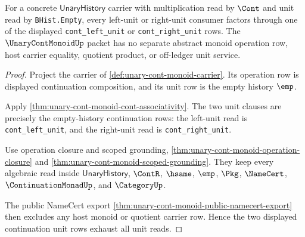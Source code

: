 \begin{theorem}
\label{thm:unary-cont-monoid-left-right-unit-exhaustion}
For a concrete $\mathsf{UnaryHistory}$ carrier with multiplication read by $\Cont$ and unit read by \texttt{BHist.Empty}, every left-unit or right-unit consumer factors through one of the displayed \texttt{cont\_left\_unit} or \texttt{cont\_right\_unit} rows. The $\UnaryContMonoidUp$ packet has no separate abstract monoid operation row, host carrier equality, quotient product, or off-ledger unit service.
\end{theorem}
\begin{proof}
Project the carrier of \autoref{def:unary-cont-monoid-carrier}. Its operation row is displayed continuation composition, and its unit row is the empty history $\emp$.

Apply \autoref{thm:unary-cont-monoid-cont-associativity}. The two unit clauses are precisely the empty-history continuation rows: the left-unit read is \texttt{cont\_left\_unit}, and the right-unit read is \texttt{cont\_right\_unit}.

Use operation closure and scoped grounding, \autoref{thm:unary-cont-monoid-operation-closure} and \autoref{thm:unary-cont-monoid-scoped-grounding}. They keep every algebraic read inside $\mathsf{UnaryHistory}$, $\ContR$, $\hsame$, $\emp$, $\Pkg$, $\NameCert$, $\ContinuationMonadUp$, and $\CategoryUp$.

The public NameCert export \autoref{thm:unary-cont-monoid-public-namecert-export} then excludes any host monoid or quotient carrier row. Hence the two displayed continuation unit rows exhaust all unit reads.
\end{proof}

